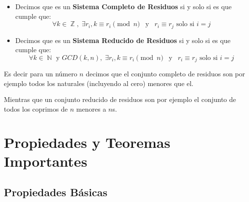 \documentclass[12pt, fleqn]{report}                             %
\DeclareMathOperator \Space {\quad}                             %
\DeclareMathOperator \MiniSpace {\;}                            %
\newcommand \Also {\MiniSpace \text{y} \MiniSpace}              %
\DeclareMathOperator \Naturals  {\mathbb{N}}                     %
\DeclareMathOperator \Integers  {\mathbb{Z}}                     %
\begin{document}
            \begin{itemize}
                \item Decimos que es un \textbf{Sistema Completo de Residuos}
                    si y solo si es que cumple que:
                    \begin{equation*}
                        \forall k \in \Integers, \; \exists r_i, k \equiv r_i \pmod{n} 
                        \Also
                        r_i \equiv r_j \text{ solo si } i = j 
                    \end{equation*}

                \item Decimos que es un \textbf{Sistema Reducido de Residuos}
                    si y solo si es que cumple que:
                    \begin{equation*}
                        \forall k \in \Naturals \text{ y } GCD(k, n), \; 
                            \exists r_i, k \equiv r_i \pmod{n} 
                        \Also
                        r_i \equiv r_j \text{ solo si } i = j 
                    \end{equation*}
            \end{itemize}

            Es decir para un número $n$ decimos que el conjunto completo de residuos
            son por ejemplo todos los naturales (incluyendo al cero) menores que el.

            Mientras que un conjunto reducido de residuos son por ejemplo el conjunto
            de todos los coprimos de $n$ menores a $n$s.





    \clearpage
    \section{Propiedades y Teoremas Importantes}


        \subsection{Propiedades Básicas}
\end{document}
